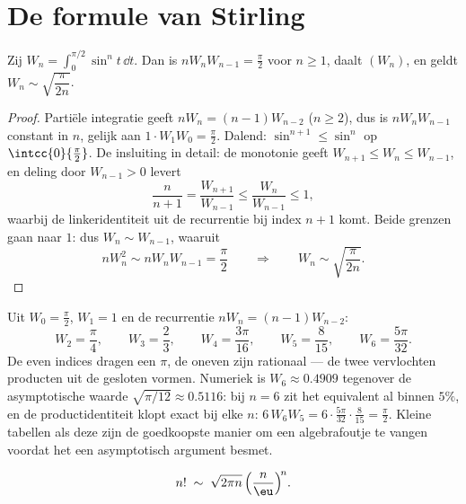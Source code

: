 \section{De formule van Stirling}

\begin{lemma}\label{lem:b2:comparison:wallis}
Zij $W_n = \int_0^{\pi/2} \sin^n t\,\dd t$. Dan is $nW_nW_{n-1} =
\frac\pi2$ voor $n \geq 1$, daalt $(W_n)$, en geldt $W_n \sim
\sqrt{\dfrac{\pi}{2n}}$.
\end{lemma}

\begin{proof}
Partiële integratie geeft $nW_n = (n-1)W_{n-2}$ ($n \geq 2$), dus
is $nW_nW_{n-1}$ constant in $n$, gelijk aan $1 \cdot W_1 W_0 =
\frac\pi2$. Dalend: $\sin^{n+1} \leq \sin^n$ op
$\intcc{0}{\frac\pi2}$. De insluiting in detail: de monotonie geeft
$W_{n+1} \leq W_n \leq W_{n-1}$, en deling door $W_{n-1} > 0$
levert
\[
\frac{n}{n+1} = \frac{W_{n+1}}{W_{n-1}} \leq
\frac{W_n}{W_{n-1}} \leq 1 ,
\]
waarbij de linkeridentiteit uit de recurrentie bij index $n + 1$
komt. Beide grenzen gaan naar $1$: dus $W_n \sim W_{n-1}$, waaruit
\[
nW_n^2 \sim nW_nW_{n-1} = \frac\pi2
\qquad\Longrightarrow\qquad
W_n \sim \sqrt{\frac{\pi}{2n}} .
\]
\end{proof}

\begin{example}\label{ex:b2:comparison:wallisvalues}
Uit $W_0 = \frac\pi2$, $W_1 = 1$ en de recurrentie $nW_n =
(n-1)W_{n-2}$:
\[
W_2 = \frac\pi4, \qquad
W_3 = \frac23, \qquad
W_4 = \frac{3\pi}{16}, \qquad
W_5 = \frac{8}{15}, \qquad
W_6 = \frac{5\pi}{32}.
\]
De even indices dragen een $\pi$, de oneven zijn rationaal --- de
twee vervlochten producten uit de gesloten vormen. Numeriek is
$W_6 \approx 0.4909$ tegenover de asymptotische waarde
$\sqrt{\pi/12} \approx 0.5116$: bij $n = 6$ zit het equivalent al
binnen $5\%$, en de productidentiteit klopt exact bij elke $n$:
$6\,W_6W_5 = 6\cdot\frac{5\pi}{32}\cdot\frac8{15} = \frac\pi2$.
Kleine tabellen als deze zijn de goedkoopste manier om een
algebrafoutje te vangen voordat het een asymptotisch argument
besmet.
\end{example}

\begin{theorem}[Stirling]\label{thm:b2:comparison:stirling}
\[
n! \;\sim\; \sqrt{2\pi n}\, \Bigl(\frac{n}{\eu}\Bigr)^{\!n}
.\index{formule van Stirling}
\]
\end{theorem}

